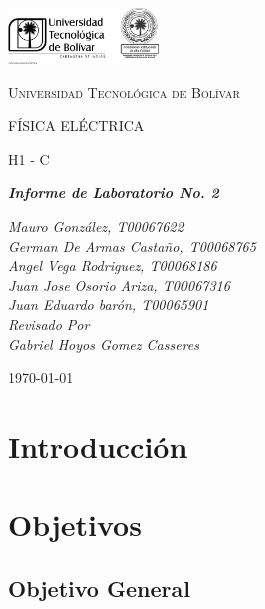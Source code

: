 \documentclass[letterpaper, 12pt]{report}
\begin{document}
\begin{titlepage}
	\centering
	\includegraphics[width=0.3\textwidth]{Images/logo_utb.png}\par\vspace{1cm}
	{\scshape\LARGE Universidad Tecnológica de Bolívar \par}
	\vspace{1cm}

	{\scshape\Large FÍSICA ELÉCTRICA \par}
	\vspace{.2cm}

	{\scshape\Large H1 - C \par}
	\vspace{1cm}
	\slshape {\Large \bfseries{}Informe de Laboratorio No. 2 \\}
	\vspace{1cm}

	\slshape {\itshape{} Mauro González, T00067622 \\}
	\slshape {\itshape{} German De Armas Castaño, T00068765 \\}
	\slshape {\itshape{} Angel Vega Rodriguez, T00068186 \\}
	\slshape {\itshape{} Juan Jose Osorio Ariza, T00067316 \\}
	\slshape {\itshape{} Juan Eduardo barón, T00065901 \\}
	\vfill
	Revisado Por \\
	Gabriel Hoyos Gomez Casseres\\
	{\large \today\par}
\end{titlepage}

\section{Introducción}

\newpage

\section{Objetivos}

\subsection{Objetivo General}
\end{document}
